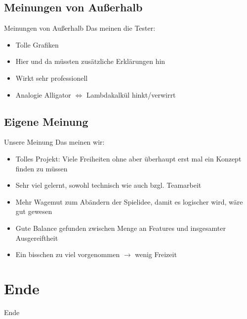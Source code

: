 \documentclass[18pt]{beamer}
\begin{document}
	\subsection{Meinungen von Außerhalb}
	\begin{frame}[<+->]{Meinungen von Außerhalb}
		Das meinen die Tester:
		\begin{itemize}
			\item Tolle Grafiken
			\item Hier und da müssten zusätzliche Erklärungen hin
			\item Wirkt sehr professionell
			\item Analogie Alligator $\Leftrightarrow$ Lambdakalkül hinkt/verwirrt
		\end{itemize}
	\end{frame}

	\subsection{Eigene Meinung}
	\begin{frame}[<+->]{Unsere Meinung}
		Das meinen wir:
		\begin{itemize}
			\item Tolles Projekt: Viele Freiheiten ohne aber überhaupt erst mal ein Konzept finden zu müssen
			\item Sehr viel gelernt, sowohl technisch wie auch bzgl. Teamarbeit
			\item Mehr Wagemut zum Abändern der Spielidee, damit es logischer wird, wäre gut gewesen
			\item Gute Balance gefunden zwischen Menge an Features und insgesamter Ausgereiftheit
			\item Ein bisschen zu viel vorgenommen $\rightarrow$ wenig Freizeit
		\end{itemize}
	\end{frame}


\section{Ende}
	\begin{frame}{Ende}
	\end{frame}
\end{document}
